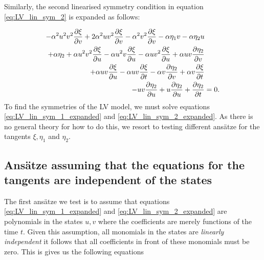 Similarly, the second linearised symmetry condition in equation \eqref{eq:LV_lin_sym_2} is expanded as follows:



\begin{align}
  - \alpha^{2} u^{2} v^{2} \pdv{\xi}{v}  + 2 \alpha^{2} u v^{2} \pdv{\xi}{v} - \alpha^{2} v^{2} \pdv{\xi}{v} - \alpha \eta_1 v - \alpha \eta_2 u&\nonumber\\
  + \alpha \eta_2 + \alpha u^{2} v^{2} \pdv{\xi}{u} - \alpha u^{2} v \pdv{\xi}{u} - \alpha u v^{2} \pdv{\xi}{u} + \alpha u v \pdv{\eta_2}{v}&\nonumber\\
  + \alpha u v \pdv{\xi}{u}  - \alpha u v \pdv{\xi}{t} - \alpha v \pdv{\eta_2}{v}  + \alpha v \pdv{\xi}{t}&\label{eq:LV_lin_sym_2_expanded}\\
  - u v \pdv{\eta_2}{u}  + u \pdv{\eta_2}{u}  + \pdv{\eta_2}{t}&=0.\nonumber
\end{align}
To find the symmetries of the LV model, we must solve equations \eqref{eq:LV_lin_sym_1_expanded} and \eqref{eq:LV_lin_sym_2_expanded}. As there is no general theory for how to do this, we resort to testing different ans\"atze for the tangents $\xi,\eta_1$ and $\eta_2$. 

\subsection{Ans\"atze assuming that the equations for the tangents are independent of the states}
The first ans\"atze we test is to assume that equations \eqref{eq:LV_lin_sym_1_expanded} and \eqref{eq:LV_lin_sym_2_expanded} are polynomials in the states $u,v$ where the coefficients are merely functions of the time $t$. Given this assumption, all monomials in the states are \textit{linearly independent} it follows that all coefficients in front of these monomials must be zero. This is gives us the following equations



